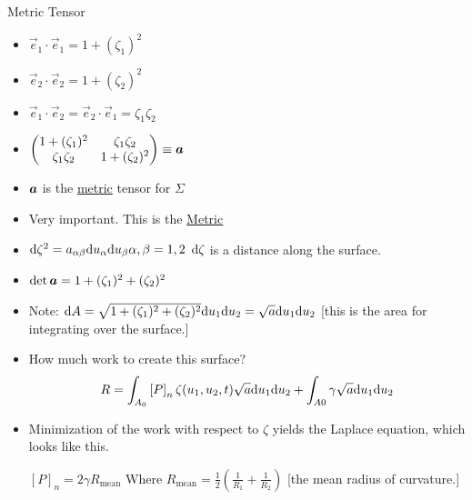 \documentclass{article}
\begin{document}
      \begin{section}{Metric Tensor}
	\begin{itemize}
	  \item  $\vec{e}_1 \cdot \vec{e}_1 = 1 + (\zeta_1)^2$ 
	  \item  $\vec{e}_2\cdot \vec{e}_2 = 1 + (\zeta_2)^2$
	  \item $\vec{e}_1 \cdot \vec{e}_2 = \vec{e}_2 \cdot \vec{e}_1 = \zeta_1\zeta_2$
	  \item $\begin{pmatrix}1 + (\zeta_1)^2 & \zeta_1\zeta_2\\
	  \zeta_1\zeta_2 & 1 + (\zeta_2)^2\end{pmatrix} \equiv \bm{a}$

	  \item $\bm{a}$ is the \underline{metric} tensor for $\Sigma$
	  \item Very important. This is the \underline{Metric}
	  \item $\mathrm{d}\zeta^2 = a_{\alpha\beta} \mathrm{d} u_\alpha \mathrm{d} u_\beta \alpha,\beta = 1,2$
	    $\mathrm{d}\zeta$ is a distance along the surface.

	  \item $\det{\bm{a}}= 1 + (\zeta_1)^2 + (\zeta_2)^2$ 
	  \item Note: $\mathrm{d} A = \sqrt{1 + (\zeta_1)^2 + (\zeta_2)^2} \mathrm{d} u_1 \mathrm{d} u_2 = \sqrt{a} \mathrm{d} u_1 \mathrm{d} u_2$ [this is the area for integrating over the surface.]

		\item How much work to create this surface? \begin{align*}R = \int_{A_0} \left[ P\right]_n \zeta(u_1,u_2,t) \sqrt{a}\mathrm{d} u_1 \mathrm{d} u_2 + \int_{A0} \gamma\sqrt{a} \mathrm{d} u_1 \mathrm{d} u_2 \end{align*}
	  \item Minimization of the work with respect to $\zeta$ yields the Laplace equation, which looks like this.

	    $[P]_n = 2\gamma R_{\mathrm{mean}}$
	    Where $R_{\mathrm{mean}} = \frac{1}{2}\left(\frac{1}{R_1} + \frac{1}{R_2}\right)$ [the mean radius of curvature.]
	\end{itemize}
      \end{section}
\end{document}

